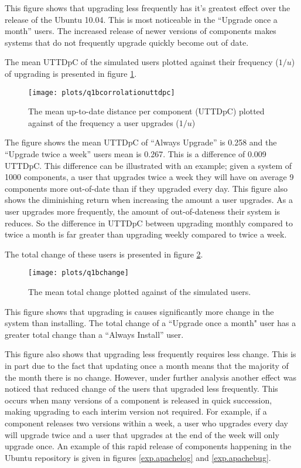 This figure shows that upgrading less frequently has it's greatest effect over the release of the Ubuntu 10.04.
This is most noticeable in the ``Upgrade once a month'' users.
The increased release of newer versions of components makes systems that do not frequently upgrade quickly become out of date.

The mean UTTDpC of the simulated users plotted against their frequency ($1/u$) of upgrading is presented in figure \ref{exp.q1bcorrolationuttdpc}.
\begin{figure}[htp]
\begin{center}
  \texttt{[image: plots/q1bcorrolationuttdpc]}
  \caption{The mean up-to-date distance per component (UTTDpC) plotted against of the frequency a user upgrades ($1/u$)}
  \label{exp.q1bcorrolationuttdpc}
\end{center}
\end{figure}

The figure shows the mean UTTDpC of ``Always Upgrade'' is 0.258 and the ``Upgrade twice a week'' users mean is 0.267.
This is a difference of 0.009 UTTDpC.
This difference can be illustrated with an example; given a system of 1000 components, 
a user that upgrades twice a week they will have on average 9 components more out-of-date than if they upgraded every day. 
This figure also shows the diminishing return when increasing the amount a user upgrades.
As a user upgrades more frequently, the amount of out-of-dateness their system is reduces.
So the difference in UTTDpC between upgrading monthly compared to twice a month is far greater than upgrading weekly compared to twice a week.

The total change of these users is presented in figure \ref{exp.q1bchange}.
\begin{figure}[htp]
\begin{center}
  \texttt{[image: plots/q1bchange]}
  \caption{The mean total change plotted against of the simulated users.}
  \label{exp.q1bchange}
\end{center}
\end{figure}
This figure shows that upgrading is causes significantly more change in the system than installing.
The total change of a ``Upgrade once a month" user has a greater total change than a ``Always Install'' user.

This figure also shows that upgrading less frequently requires less change. 
This is in part due to the fact that updating once a month means that the majority of the month there is no change.
However, under further analysis another effect was noticed that reduced change of the users that upgraded less frequently.
This occurs when many versions of a component is released in quick succession, making upgrading to each interim version not required.
For example, if a component releases two versions within a week, a user who upgrades every day will upgrade twice and a user that upgrades at the end of the week will only upgrade once.
An example of this rapid release of components happening in the Ubuntu repository is given in figures \ref{exp.apachelog} and \ref{exp.apachebug}.

